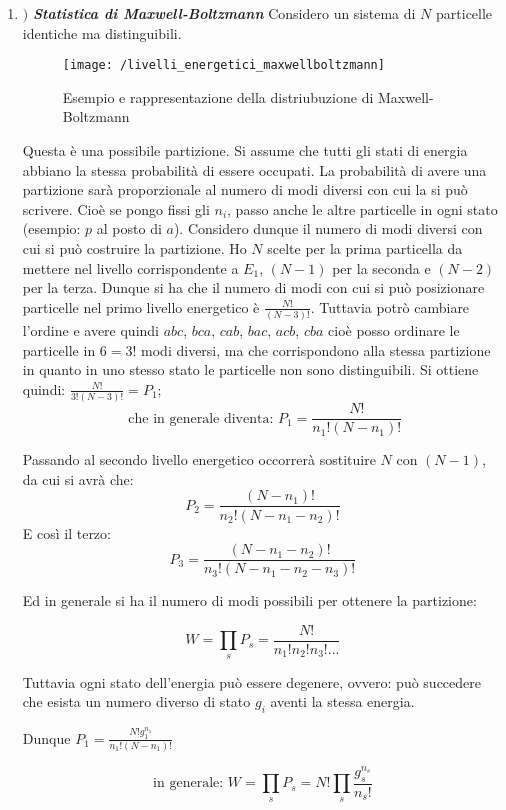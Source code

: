 \begin{enumerate}[label=\Roman*]

\item  $\Bigr)$
\emph{\textbf{Statistica di Maxwell-Boltzmann}}
Considero un sistema di $N$ particelle identiche ma distinguibili.

\begin{figure}[h]
\centering
\texttt{[image: /livelli\_energetici\_maxwellboltzmann]}
\caption{Esempio e rappresentazione della distriubuzione di Maxwell-Boltzmann}
\end{figure}

Questa è una possibile partizione.
Si assume che tutti gli stati di energia abbiano la stessa probabilità di essere occupati.
La probabilità di avere una partizione sarà proporzionale al numero di modi diversi con cui la si può scrivere.
Cioè se pongo fissi gli $n_i$, passo anche le altre particelle in ogni stato (esempio: $p$ al posto di $a$). 
Considero dunque il numero di modi diversi con cui si può costruire la partizione.
Ho $N$ scelte per la prima particella da mettere nel livello corrispondente a $E_1$, $(N-1)$ per la seconda e $(N-2)$ per la terza.
Dunque si ha che il numero di modi con cui si può posizionare particelle nel primo livello energetico è $\frac{N!}{(N-3)!}$.
Tuttavia potrò cambiare l'ordine e avere quindi $abc$, $bca$, $cab$, $bac$, $acb$, $cba$ cioè posso ordinare le particelle in $6 = 3!$ modi diversi,
ma che corrispondono alla stessa partizione in quanto in uno stesso stato le particelle non sono distinguibili.
Si ottiene quindi: $ \frac{N!}{3! (N-3)!} = P_1 $;
$$ \mbox{ che in generale diventa: } P_1 = \frac{N!}{n_1! (N-n_1)!} $$

Passando al secondo livello energetico occorrerà sostituire $N$ con $(N-1)$, da cui si avrà che:
$$ P_2 = \frac{(N-n_1)!}{n_2! ( N - n_1 - n_2)!} $$
E così il terzo:
$$ P_3 = \frac{(N-n_1 - n_2)!}{n_3! ( N - n_1 - n_2 - n_3)!} $$

Ed in generale si ha il numero di modi possibili per ottenere la partizione:

$$ W =  \prod_s P_s = \frac{N!}{n_1! n_2! n_3! ... }  $$

Tuttavia ogni stato dell'energia può essere degenere, ovvero:
può succedere che esista un numero diverso di stato $g_i$ aventi la stessa energia.

Dunque $P_1 = \frac{N! g_1^{n_1}}{n_1! (N - n_1)!}$

$$ \mbox{in generale: } W =  \prod_s P_s = N! \prod_s \frac{g_s^{n_s}}{n_s!} $$


\end{enumerate}
